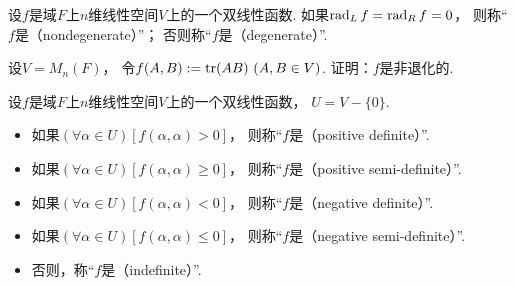 \begin{definition}
设\(f\)是域\(F\)上\(n\)维线性空间\(V\)上的一个双线性函数.
如果\(\operatorname{rad}_L f = \operatorname{rad}_R f = 0\)，
则称“\(f\)是（nondegenerate）”；
否则称“\(f\)是（degenerate）”.
\end{definition}

\begin{example}
设\(V = M_n(F)\)，
令\(f(A,B) := \tr(AB)\ (A,B \in V)\).
证明：\(f\)是非退化的.
\end{example}

\begin{definition}
设\(f\)是域\(F\)上\(n\)维线性空间\(V\)上的一个双线性函数，
\(U = V-\{0\}\).
\begin{itemize}
	\item 如果\(
		(\forall \alpha \in U)
		[f(\alpha,\alpha) > 0]
	\)，
	则称“\(f\)是（positive definite）”.

	\item 如果\(
		(\forall \alpha \in U)
		[f(\alpha,\alpha) \geq 0]
	\)，
	则称“\(f\)是（positive semi-definite）”.

	\item 如果\(
		(\forall \alpha \in U)
		[f(\alpha,\alpha) < 0]
	\)，
	则称“\(f\)是（negative definite）”.

	\item 如果\(
		(\forall \alpha \in U)
		[f(\alpha,\alpha) \leq 0]
	\)，
	则称“\(f\)是（negative semi-definite）”.

	\item 否则，称“\(f\)是（indefinite）”.
\end{itemize}
\end{definition}

